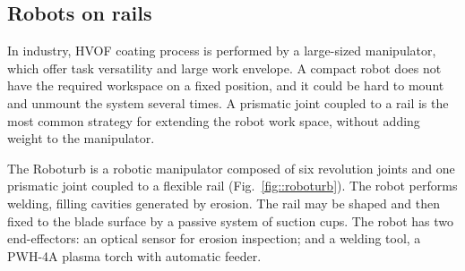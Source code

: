 \subsection{Robots on rails}\label{sec::rail}
In industry, HVOF coating process is performed by a large-sized manipulator,
which offer task versatility and large work envelope. A compact robot does not
have the required workspace on a fixed position, and it could be hard to mount
and unmount the system several times. A prismatic joint coupled to a rail is the
most common strategy for extending the robot work space, without adding weight
to the manipulator.





The Roboturb \citep{roboturb} is a robotic manipulator composed of six
revolution joints and one prismatic joint coupled to a flexible rail
(Fig.~\ref{fig::roboturb}).
The robot performs welding, filling cavities generated by erosion. The rail
may be shaped and then fixed to the blade surface by a passive system of
suction cups. The robot has two end-effectors: an optical sensor for erosion
inspection; and a welding tool, a PWH-4A plasma torch with automatic feeder.

